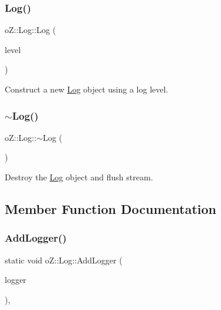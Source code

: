 \subsubsection{\texorpdfstring{Log()}{Log()}\hspace{0.1cm}{\footnotesize\ttfamily [2/2]}}
{\footnotesize\ttfamily o\+Z\+::\+Log\+::\+Log (\begin{DoxyParamCaption}\item[{\mbox{\hyperlink{namespaceo_z_a72fc7662d5f07391ac6f0a5699014bfa}{Level}}}]{level }\end{DoxyParamCaption})\hspace{0.3cm}{\ttfamily [inline]}}



Construct a new \mbox{\hyperlink{classo_z_1_1_log}{Log}} object using a log level. 

\mbox{\label{classo_z_1_1_log_a28d6db7c25427e63d38eebfc05290b52}} 
\subsubsection{\texorpdfstring{$\sim$Log()}{~Log()}}
{\footnotesize\ttfamily o\+Z\+::\+Log\+::$\sim$\+Log (\begin{DoxyParamCaption}\item[{void}]{ }\end{DoxyParamCaption})\hspace{0.3cm}{\ttfamily [inline]}}



Destroy the \mbox{\hyperlink{classo_z_1_1_log}{Log}} object and flush stream. 



\subsection{Member Function Documentation}
\mbox{\label{classo_z_1_1_log_a09f81a16467abe5e5f38d4caf9d9e738}} 
\subsubsection{\texorpdfstring{AddLogger()}{AddLogger()}}
{\footnotesize\ttfamily static void o\+Z\+::\+Log\+::\+Add\+Logger (\begin{DoxyParamCaption}\item[{\mbox{\hyperlink{namespaceo_z_aaa2fbabbfafc6616a7e69651b62a3d4e}{Logger\+Ptr}}}]{logger }\end{DoxyParamCaption})\hspace{0.3cm}{\ttfamily [inline]}, {\ttfamily [static]}}



